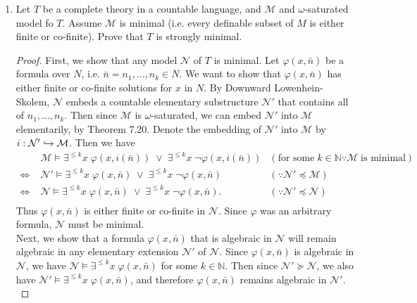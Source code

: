 \documentclass{article}
\begin{document}
\begin{enumerate}[label={\bf Q\arabic*:}]
  \item Let $T$ be a complete theory in a countable language, and
    $\mathcal{M}$ and $\omega$-saturated model fo $T$. Assume $\mathcal{M}$
    is minimal (i.e. every definable subset of $M$ is either finite or
    co-finite). Prove that $T$ is strongly minimal.

    \begin{proof}
      First, we show that any model $\mathcal{N}$ of $T$ is minimal.
      Let $\varphi(x,\bar{n})$ be a formula over
      $N$, i.e. $\bar{n}=n_1,\ldots,n_k\in N$. We want to show that
      $\varphi(x,\bar{n})$ has either finite or co-finite solutions for $x$
      in $N$. By Downward Lowenhein-Skolem, $\mathcal{N}$ embeds a
      countable elementary substructure $\mathcal{N}'$ that contains all of
      $n_1,\ldots,n_k$. Then since $\mathcal{M}$ is $\omega$-saturated, we
      can embed $\mathcal{N}'$ into $\mathcal{M}$ elementarily, by Theorem
      7.20. Denote the embedding of $\mathcal{N}'$ into $\mathcal{M}$ by
      $i:\mathcal{N}'\xhookrightarrow{}\mathcal{M}$. Then we have
      \begin{align*}
          &\mathcal{M}\models \exists^{\leq k}x\; \varphi(x,i(\bar{n}))\;
          \vee\; \exists^{\leq k}x\; \neg\varphi(x,i(\bar{n})) &
          (\text{for some}\; k\in\mathbb{N}\because\mathcal{M}\; \text{is
          minimal}) \\
        \Leftrightarrow\; &\mathcal{N}'\models \exists^{\leq k}x\;
          \varphi(x,\bar{n})\; \vee\; \exists^{\leq k}x\;
          \neg\varphi(x,\bar{n}) &
          (\because\mathcal{N}'\preceq\mathcal{M}) \\
        \Leftrightarrow\; &\mathcal{N}\models \exists^{\leq k}x\;
          \varphi(x,\bar{n})\; \vee\; \exists^{\leq k}x\;
          \neg\varphi(x,\bar{n}). &
          (\because\mathcal{N}'\preceq\mathcal{N}) \\
      \end{align*}
      Thus $\varphi(x,\bar{n})$ is either finite or co-finite in
      $\mathcal{N}$. Since $\varphi$ was an arbitrary formula,
      $\mathcal{N}$ must be minimal. \\

      Next, we show that a formula $\varphi(x,\bar{n})$ that is algebraic
      in $\mathcal{N}$ will remain algebraic in any elementary extension
      $\mathcal{N}'$ of $\mathcal{N}$. Since $\varphi(x,\bar{n})$ is
      algebraic in $\mathcal{N}$, we have $\mathcal{N}\models\exists^{\leq
      k}x\; \varphi(x,\bar{n})$ for some $k\in\mathbb{N}$. Then since
      $\mathcal{N}'\succeq\mathcal{N}$, we also have
      $\mathcal{N}'\models\exists^{\leq k}x\; \varphi(x,\bar{n})$, and
      therefore $\varphi(x,\bar{n})$ remains algebraic in $\mathcal{N}'$.
      \\


\end{proof}
\end{enumerate}
\end{document}
